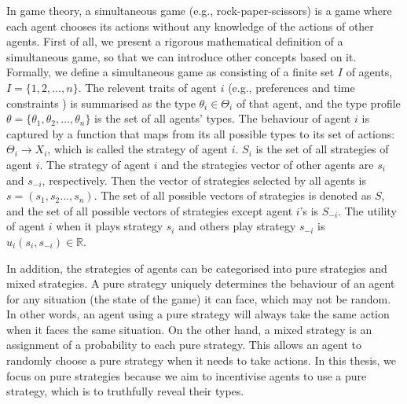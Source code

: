 \documentclass[11pt]{phdthesis}
\begin{document}
In game theory, a simultaneous game (e.g., rock-paper-scissors) is a game where each agent chooses its actions without any knowledge of the actions of other agents. First of all, we present a rigorous mathematical definition of a simultaneous game, so that we can introduce other concepts based on it.
Formally, we define a simultaneous game as consisting of a finite set $I$ of agents, $I = \{1,2,...,n \}$. The relevent traits of agent $ i $ (e.g., preferences and time constraints ) is summarised as the type $ \theta_i \in \Theta_{i} $ of that agent, and the type profile $ \theta = \{ \theta_1, \theta_2, \ldots, \theta_n\} $ is the set of all agents' types. The behaviour of agent $ i $ is captured by a function that maps from its all possible types to its set of actions: $\Theta_i \rightarrow X_i$, which is called the strategy of agent $ i $. $S_i$ is the set of all strategies of agent $i$. The strategy of agent $i$ and the strategies vector of other agents are $s_i$ and $s_{-i}$, respectively. Then the vector of strategies selected by all agents is $s=(s_1,s_2...,s_n)$. The set of all possible vectors of strategies is denoted as $S$, and the set of all possible vectors of strategies except agent $i$'s is $S_{-i}$. The utility of agent $i$ when it plays strategy $s_i$ and others play strategy $s_{-i}$ is $u_i(s_i,s_{-i}) \in \mathbb{R}$. 

In addition, the strategies of agents can be categorised into pure strategies and mixed strategies. A pure strategy uniquely determines the behaviour of an agent for any situation (the state of the game) it can face, which may not be random. In other words, an agent using a pure strategy will always take the same action when it faces the same situation. On the other hand, a mixed strategy is an assignment of a probability to each pure strategy. This allows an agent to randomly choose a pure strategy when it needs to take actions. In this thesis, we focus on pure strategies because we aim to incentivise agents to use a pure strategy, which is to truthfully reveal their types.
\end{document}
